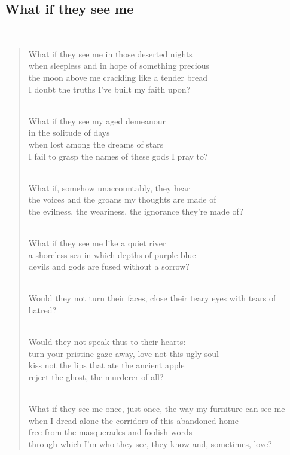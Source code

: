 \documentclass[a4paper, 12pt]{article}
\begin{document}
\subsection{What if they see me}
~ 
\begin{verse}
    
What if they see me in those deserted nights\\
when sleepless and in hope of something precious\\
the moon above me crackling like a tender bread\\
I doubt the truths I’ve built my faith upon?\\
~ 

What if they see my aged demeanour\\
in the solitude of days\\
when lost among the dreams of stars\\
I fail to grasp the names of these gods I pray to?\\
~ 

What if, somehow unaccountably, they hear\\
the voices and the groans my thoughts are made of\\
the evilness, the weariness, the ignorance they’re made of?\\
~ 

What if they see me like a quiet river\\
a shoreless sea in which depths of purple blue\\
devils and gods are fused without a sorrow?\\
~ 

Would they not turn their faces, close their teary eyes with tears of hatred?\\
~ 

Would they not speak thus to their hearts:\\
turn your pristine gaze away, love not this ugly soul\\
kiss not the lips that ate the ancient apple\\
reject the ghost, the murderer of all?\\
~ 

What if they see me once, just once, the way my furniture can see me\\
when I dread alone the corridors of this abandoned home\\
free from the masquerades and foolish words\\
through which I’m who they see, they know and, sometimes, love?\\
\end{verse}
\end{document}
